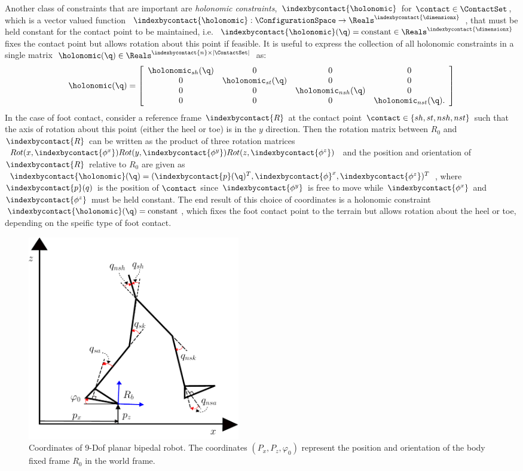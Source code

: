 Another class of constraints that are important are \textit{holonomic constraints}, $\indexbycontact{\holonomic}$ for $\contact \in \ContactSet$, which is a vector valued function $\indexbycontact{\holonomic} : \ConfigurationSpace \to \Reals^{\indexbycontact{\dimensionx}}$, that must be held constant for the contact point to be maintained, i.e. $\indexbycontact{\holonomic}(\q) = \text{constant} \in \Reals^{\indexbycontact{\dimensionx}}$ fixes the contact point but allows rotation about this point if feasible. It is useful to express the collection of all holonomic constraints in a single matrix $\holonomic(\q) \in \Reals^{\indexbycontact{n} \times | \ContactSet |}$ as:
\begin{align}
 \holonomic(\q) = \left[
 \begin{array}{c c c c}
  \holonomic_{sh}(\q) &0 &0 &0 \\
  0 &\holonomic_{st}(\q) &0 &0 \\
  0 &0 &\holonomic_{nsh}(\q) &0 \\
  0 &0 &0 &\holonomic_{nst}(\q).
 \end{array}
 \right]
\end{align}
In the case of foot contact, consider a reference frame $\indexbycontact{R}$ at the contact point $\contact \in \{sh, st, nsh, nst\}$ such that the axis of rotation about this point (either the heel or toe) is in the $y$ direction. Then the rotation matrix between $R_0$ and $\indexbycontact{R}$ can be written as the product of three rotation matrices $Rot(x,\indexbycontact{\phi^x}) Rot(y,\indexbycontact{\phi^y})Rot(z,\indexbycontact{\phi^z})$ and the position and orientation of $\indexbycontact{R}$ relative to $R_0$ are given as $\indexbycontact{\holonomic}(\q) = (\indexbycontact{p}(\q)^T, \indexbycontact{\phi}^x, \indexbycontact{\phi^z})^T$, where $\indexbycontact{p}(q)$ is the position of $\contact$ since $\indexbycontact{\phi^y}$ is free to move while $\indexbycontact{\phi^x}$ and $\indexbycontact{\phi^z}$ must be held constant. The end result of this choice of coordinates is a holonomic constraint $\indexbycontact{\holonomic}(\q) = \text{constant}$, which fixes the foot contact point to the terrain but
allows rotation about the heel or toe, depending on the speific type of foot contact.


\begin{figure}[t!]
\centering
\includegraphics[width=0.45\textwidth]{figures/RobotCoords.pdf}
\caption{Coordinates of 9-Dof planar bipedal robot. The coordinates $(P_{x},P_{z},\varphi_{0})$ represent the position and orientation of the body fixed frame $R_{0}$ in the world frame.}
\label{fig:robot}
\end{figure}

